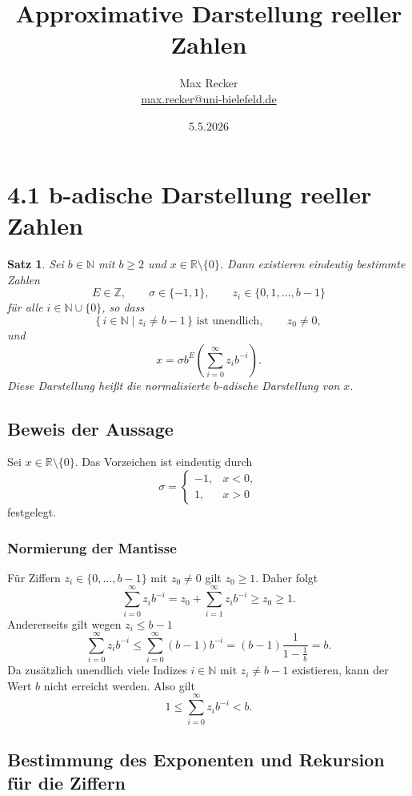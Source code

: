 \documentclass{article}
\title{Approximative Darstellung reeller Zahlen}
\date{5.5.2026}
\author{Max Recker\\ \url{max.recker@uni-bielefeld.de}}
\newcommand{\R}{\mathbb{R}}
\newcommand{\Z}{\mathbb{Z}}
\newcommand{\N}{\mathbb{N}}
\newtheorem{thm}{Satz}
\begin{document}
\maketitle

\section{4.1 b-adische Darstellung reeller Zahlen}

\begin{thm}
Sei \(b\in\N\) mit \(b\geq 2\) und \(x\in\R\setminus\{0\}\). Dann existieren eindeutig bestimmte Zahlen
\[
E\in\Z,\qquad \sigma\in\{-1,1\},\qquad z_i\in\{0,1,\dots,b-1\}
\]
für alle \(i\in\N\cup\{0\}\), so dass
\[
\{\,i\in\N\mid z_i\neq b-1\,\}
\text{ ist unendlich},
\qquad z_0\neq 0,
\]
und
\[
x=\sigma b^E\left(\sum_{i=0}^{\infty}z_i b^{-i}\right).
\]
Diese Darstellung heißt die \emph{normalisierte \(b\)-adische Darstellung} von \(x\).
\end{thm}

\subsection*{Beweis der Aussage}

Sei \(x\in\R\setminus\{0\}\). Das Vorzeichen ist eindeutig durch
\[
\sigma=
\begin{cases}
-1,&x<0,\\
1,&x>0
\end{cases}
\]
festgelegt.

\subsubsection*{Normierung der Mantisse}

Für Ziffern \(z_i\in\{0,\dots,b-1\}\) mit \(z_0\neq 0\) gilt \(z_0\geq 1\). Daher folgt
\[
\sum_{i=0}^{\infty}z_i b^{-i}
=
z_0+\sum_{i=1}^{\infty}z_i b^{-i}
\geq z_0\geq 1.
\]
Andererseits gilt wegen \(z_i\leq b-1\)
\[
\sum_{i=0}^{\infty}z_i b^{-i}
\leq
\sum_{i=0}^{\infty}(b-1)b^{-i}
=
(b-1)\frac{1}{1-\frac1b}
=b.
\]
Da zusätzlich unendlich viele Indizes \(i\in\N\) mit \(z_i\neq b-1\) existieren, kann der Wert \(b\) nicht erreicht werden. Also gilt
\[
1\leq \sum_{i=0}^{\infty}z_i b^{-i}<b.
\]

\subsection*{Bestimmung des Exponenten und Rekursion für die Ziffern}
\end{document}
